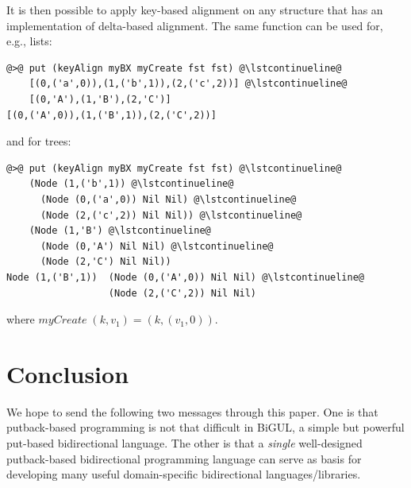 \documentclass[numbers]{sigplanconf}
\newcommand{\Conid}[1]{\mathit{#1}}
\newcommand{\Varid}[1]{\mathit{#1}}
\def\resethooks{%
  \global\let\SaveRestoreHook\empty
  \global\let\ColumnHook\empty}
\let\hspre\empty
\let\hspost\empty
\begin{document}
It is then possible to apply key-based alignment on any structure that has an
implementation of delta-based alignment. The same function can be used for,
e.g., lists:
%
\begin{lstlisting}
@>@ put (keyAlign myBX myCreate fst fst) @\lstcontinueline@
    [(0,('a',0)),(1,('b',1)),(2,('c',2))] @\lstcontinueline@
    [(0,'A'),(1,'B'),(2,'C')]
[(0,('A',0)),(1,('B',1)),(2,('C',2))]
\end{lstlisting}
%
and for trees:
%
\begin{lstlisting}
@>@ put (keyAlign myBX myCreate fst fst) @\lstcontinueline@
    (Node (1,('b',1)) @\lstcontinueline@
      (Node (0,('a',0)) Nil Nil) @\lstcontinueline@
      (Node (2,('c',2)) Nil Nil)) @\lstcontinueline@
    (Node (1,'B') @\lstcontinueline@
      (Node (0,'A') Nil Nil) @\lstcontinueline@
      (Node (2,'C') Nil Nil))
Node (1,('B',1))  (Node (0,('A',0)) Nil Nil) @\lstcontinueline@
                  (Node (2,('C',2)) Nil Nil)
\end{lstlisting}
%
where \ensuremath{\Varid{myCreate}\;(\Varid{k},v_1)\mathrel{=}(\Varid{k},(v_1,\mathrm{0}))}.
%

\section{Conclusion}

We hope to send the following two messages through this %
paper. One is that putback-based programming is not that 
difficult in BiGUL, a simple but powerful put-based bidirectional
language. The other is that a \emph{single} well-designed putback-based
bidirectional programming language can serve as basis for developing
many useful domain-specific bidirectional languages/libraries.

%

%





%
%
%
\end{document}
